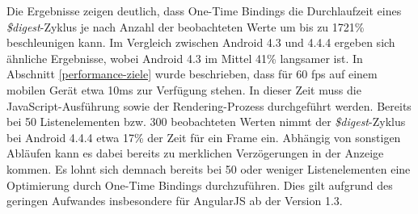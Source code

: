 Die Ergebnisse zeigen deutlich, dass One-Time Bindings die Durchlaufzeit eines \emph{\$digest}-Zyklus je nach Anzahl der beobachteten Werte um bis zu 1721\% beschleunigen kann. Im Vergleich zwischen Android 4.3 und 4.4.4 ergeben sich ähnliche Ergebnisse, wobei Android 4.3 im Mittel 41\% langsamer ist. In Abschnitt \ref{performance-ziele} wurde beschrieben, dass für 60 \gls{fps} auf einem mobilen Gerät etwa 10ms zur Verfügung stehen. In dieser Zeit muss die JavaScript-Ausführung sowie der Rendering-Prozess durchgeführt werden. Bereits bei 50 Listenelementen bzw. 300 beobachteten Werten nimmt der \emph{\$digest}-Zyklus bei Android 4.4.4 etwa 17\% der Zeit für ein Frame ein. Abhängig von sonstigen Abläufen kann es dabei bereits zu merklichen Verzögerungen in der Anzeige kommen. Es lohnt sich demnach bereits bei 50 oder weniger Listenelementen eine Optimierung durch One-Time Bindings durchzuführen. Dies gilt aufgrund des geringen Aufwandes insbesondere für AngularJS ab der Version 1.3. 